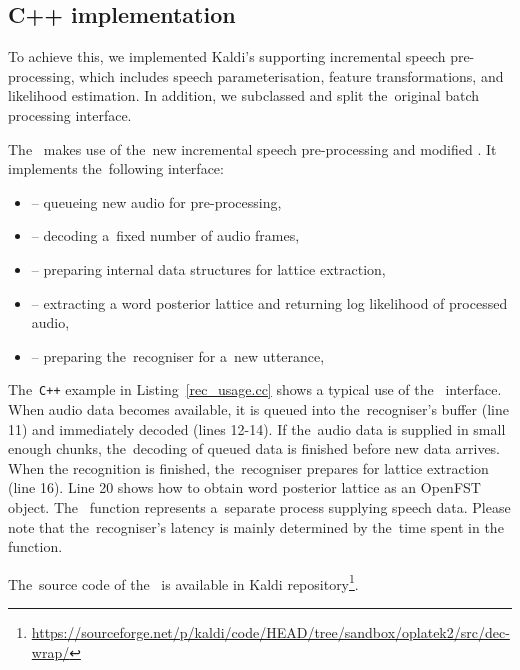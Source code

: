 \subsection{C++ implementation}
\label{sub:verb_c_}

To achieve this, we implemented Kaldi's  supporting incremental speech pre-processing, which includes speech parameterisation, feature transformations, and likelihood estimation.
In addition, we subclassed  and split the~original batch processing interface.

The~ makes use of the~new incremental speech pre-processing and modified .
It implements the~following interface:
\begin{itemize}
\item {} -- queueing new audio for pre-processing,
\item {} -- decoding a~fixed number of audio frames,
\item {} -- preparing internal data structures for lattice extraction,
\item {} -- extracting a word posterior lattice and returning log likelihood of processed audio,
\item {} -- preparing the~recogniser for a~new utterance,
\end{itemize}

The~\verb!C++! example in Listing~\ref{rec_usage.cc} shows a typical use of the~ interface.
When audio data becomes available, it is queued into the~recogniser's buffer (line 11) and immediately decoded (lines 12-14).
If the~audio data is supplied in small enough chunks, the~decoding of queued data is finished before new data arrives.
When the recognition is finished, the~recogniser prepares for lattice extraction (line 16).
Line 20 shows how to obtain word posterior lattice as an OpenFST object.
The~ function represents a~separate process supplying speech data.
Please note that the~recogniser's latency is mainly determined by the~time spent in the~ function.


The~source code of the~ is available in Kaldi repository\footnote{\url{https://sourceforge.net/p/kaldi/code/HEAD/tree/sandbox/oplatek2/src/dec-wrap/}}.

